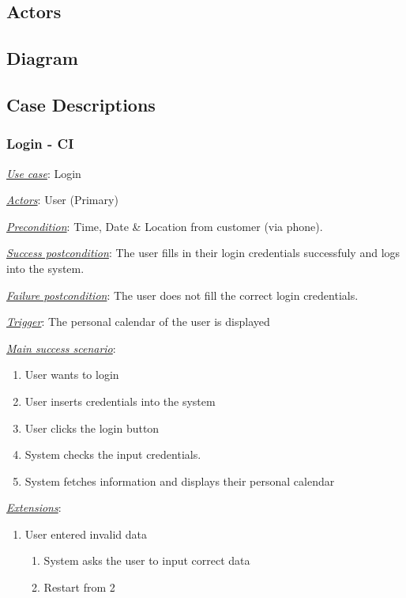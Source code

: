 \documentclass[a4paper]{article}
\begin{document}
\subsection{Actors}

\subsection{Diagram}

\subsection{Case Descriptions} %
\subsubsection{Login - CI}
\underline{\textit{Use case}}: Login

\underline{\textit{Actors}}: User (Primary)

\underline{\textit{Precondition}}: Time, Date \& Location from customer (via phone).

\underline{\textit{Success postcondition}}: The user fills in their login credentials successfuly and logs into the system.

\underline{\textit{Failure postcondition}}: The user does not fill the correct login credentials.

\underline{\textit{Trigger}}: The personal calendar of the user is displayed

\underline{\textit{Main success scenario}}: 
\begin{enumerate}[leftmargin = 3em]
    \item User wants to login
    \item User inserts credentials into the system
    \item User clicks the login button
    \item System checks the input credentials.
    \item System fetches information and displays their personal calendar
\end{enumerate} 

\underline{\textit{Extensions}}:
\begin{enumerate}[label=3\alph*, leftmargin = 3em]
    \item User entered invalid data \begin{enumerate}[label=\arabic*.]
        \item System asks the user to input correct data
        \item Restart from 2
    \end{enumerate}
\end{enumerate}
\end{document}
